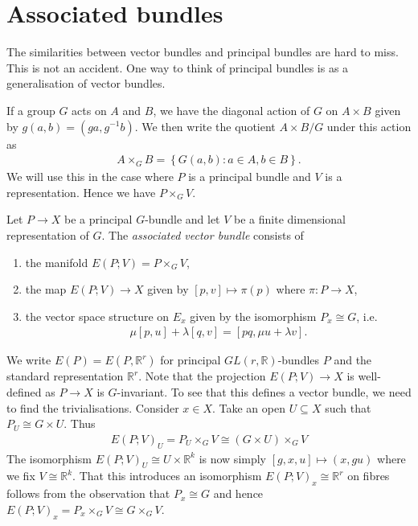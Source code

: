 \documentclass{article}
\begin{document}
\section{Associated bundles}

The similarities between vector bundles and principal bundles are
hard to miss. This is not an accident. One way to think of principal
bundles is as a generalisation of vector bundles.

If a group $G$ acts on $A$ and $B$, we have the diagonal action
of $G$ on $A\times B$ given by $g(a,b)=(ga,{g}^{-1}b)$. We then
write the quotient $A\times B/G$ under this action as
\begin{align*}
  A\times_G B = \left\lbrace{G(a,b) : a\in A, b\in B}\right\rbrace.
\end{align*}
We will use this in the case where $P$ is a principal bundle and $V$ is
a representation. Hence we have $P\times_G V$. 

\begin{definition}
  Let $P\to X$ be a principal $G$-bundle and let $V$ be a finite dimensional
  representation of $G$. The \emph{associated vector bundle} consists of
  \begin{enumerate}
    \item the manifold $E(P;V)=P\times_G V$,
    \item the map $E(P;V)\to X$ given by $[p,v]\mapsto \pi(p)$
      where $\pi:P\to X$,
    \item the vector space structure on $E_x$ given by the
      isomorphism $P_x\cong G$, i.e.
      \begin{align*}
        \mu[p,u]+\lambda[q,v] = [pq,\mu u+\lambda v].
      \end{align*}
  \end{enumerate}
\end{definition}

We write $E(P)=E(P,\mathbb{R}^r)$ for principal $GL(r,\mathbb{R})$-bundles $P$
and the standard representation $\mathbb{R}^r$.
Note that the projection $E(P;V)\to X$ is well-defined as $P\to X$ is
$G$-invariant. To see that this defines a vector bundle, we need to find the
trivialisations. Consider $x\in X$. Take an open $U\subseteq X$ such that
$P_U\cong G\times U$. Thus
\begin{align*}
  E(P;V)_U
  = P_U\times_G V
  \cong (G\times U)\times_G V
\end{align*}
The isomorphism $E(P;V)_U \cong U\times\mathbb{R}^k$ is now simply
$[g,x,u]\mapsto (x,gu)$ where we fix $V\cong\mathbb{R}^k$. That this introduces
an isomorphism $E(P;V)_x\cong\mathbb{R}^r$ on fibres follows from the observation
that $P_x\cong G$ and hence $E(P;V)_x = P_x\times_G V \cong G\times_G V$.
\end{document}
